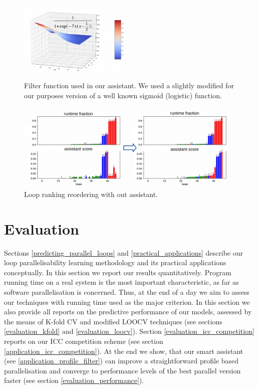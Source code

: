 \documentclass[sigconf,10pt,review,anonymous]{acmart}
\begin{document}
\begin{figure}[h]
\includegraphics[width=0.5\textwidth]{figures/sigmoid_3d.pdf}
\caption{Filter function used in our assistant. We used a slightly modified for our purposes version of a well known sigmoid (logistic) function.}
\label{fig:sigmoid_3d}
\end{figure}

\begin{figure}[h]
\includegraphics[width=\textwidth]{figures/ft_ranking.pdf}
\caption{Loop ranking reordering with out assistant. }
\label{fig:ft_loop_ranking}
\end{figure}

\section{Evaluation}
\label{evaluation}
\quad Sections \ref{predicting_parallel_loops} and \ref{practical_applications} describe our loop parallelisability learning methodology and its practical applications conceptually. In this section we report our results quantitatively.\newline\null
\quad Program running time on a real system is the most important characteristic, as far as software parallelisation is concerned. Thus, at the end of a day we aim to assess our techniques with running time used as the major criterion. In this section we also provide all reports on the predictive performance of our models, assessed by the means of K-fold CV and modified LOOCV techniques (see sections \ref{evaluation_kfold} and \ref{evaluation_loocv}). Section \ref{evaluation_icc_competition} reports on our ICC competition scheme (see section \ref{application_icc_competition}). At the end we show, that our smart assistant (see \ref{application_profile_filter}) can improve a straightforward profile based parallelisation and converge to performance levels of the best parallel version faster (see section \ref{evaluation_performance}).
\end{document}
